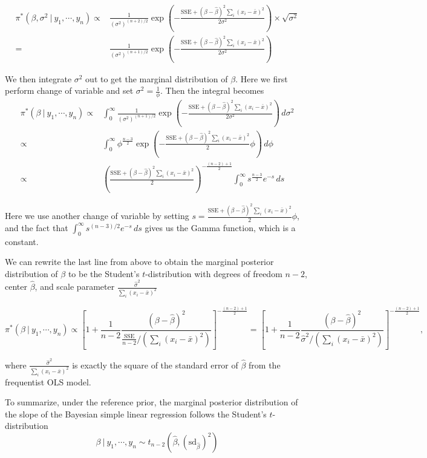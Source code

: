 \documentclass[]{book}
\theoremstyle{definition}
\theoremstyle{definition}
\theoremstyle{definition}
\theoremstyle{remark}
\begin{document}
\[
\begin{aligned}
\pi^*(\beta, \sigma^2~|~y_1,\cdots,y_n) 
\propto & \frac{1}{(\sigma^2)^{(n+2)/2}}\exp\left(-\frac{\text{SSE}+(\beta-\hat{\beta})^2\sum_i(x_i-\bar{x})^2}{2\sigma^2}\right) \times \sqrt{\sigma^2}\\
= & \frac{1}{(\sigma^2)^{(n+1)/2}}\exp\left(-\frac{\text{SSE}+(\beta-\hat{\beta})^2\sum_i (x_i-\bar{x})^2}{2\sigma^2}\right)
\end{aligned}
\]

We then integrate \(\sigma^2\) out to get the marginal distribution of
\(\beta\). Here we first perform change of variable and set
\(\sigma^2 = \frac{1}{\phi}\). Then the integral becomes \[
\begin{aligned}
\pi^*(\beta~|~y_1,\cdots, y_n) \propto & \int_0^\infty \frac{1}{(\sigma^2)^{(n+1)/2}}\exp\left(-\frac{\text{SSE} + (\beta-\hat{\beta})^2\sum_i(x_i-\bar{x})^2}{2\sigma^2}\right)\, d\sigma^2 \\
\propto & \int_0^\infty \phi^{\frac{n-3}{2}}\exp\left(-\frac{\text{SSE}+(\beta-\hat{\beta})^2\sum_i(x_i-\bar{x})^2}{2}\phi\right)\, d\phi\\
\propto & \left(\frac{\text{SSE}+(\beta-\hat{\beta})^2\sum_i(x_i-\bar{x})^2}{2}\right)^{-\frac{(n-2)+1}{2}}\int_0^\infty s^{\frac{n-3}{2}}e^{-s}\, ds
\end{aligned}
\]

Here we use another change of variable by setting
\(\displaystyle s= \frac{\text{SSE}+(\beta-\hat{\beta})^2\sum_i(x_i-\bar{x})^2}{2}\phi\),
and the fact that \(\displaystyle \int_0^\infty s^{(n-3)/2}e^{-s}\, ds\)
gives us the Gamma function, which is a constant.

We can rewrite the last line from above to obtain the marginal posterior
distribution of \(\beta\) to be the Student's \(t\)-distribution with
degrees of freedom \(n-2\), center \(\hat{\beta}\), and scale parameter
\(\displaystyle \frac{\hat{\sigma}^2}{\sum_i(x_i-\bar{x})^2}\)

\[ \pi^*(\beta~|~y_1,\cdots,y_n) \propto
 \left[1+\frac{1}{n-2}\frac{(\beta - \hat{\beta})^2}{\frac{\text{SSE}}{n-2}/(\sum_i (x_i-\bar{x})^2)}\right]^{-\frac{(n-2)+1}{2}} = \left[1 + \frac{1}{n-2}\frac{(\beta - \hat{\beta})^2}{\hat{\sigma}^2/(\sum_i (x_i-\bar{x})^2)}\right]^{-\frac{(n-2)+1}{2}},
\]

where \(\displaystyle \frac{\hat{\sigma}^2}{\sum_i (x_i-\bar{x})^2}\) is
exactly the square of the standard error of \(\hat{\beta}\) from the
frequentist OLS model.

To summarize, under the reference prior, the marginal posterior
distribution of the slope of the Bayesian simple linear regression
follows the Student's \(t\)-distribution \[ 
\beta ~|~y_1,\cdots, y_n \sim t_{n-2}\left(\hat{\beta}, \left(\text{sd}_{\hat{\beta}}\right)^2\right) 
\]
\end{document}
